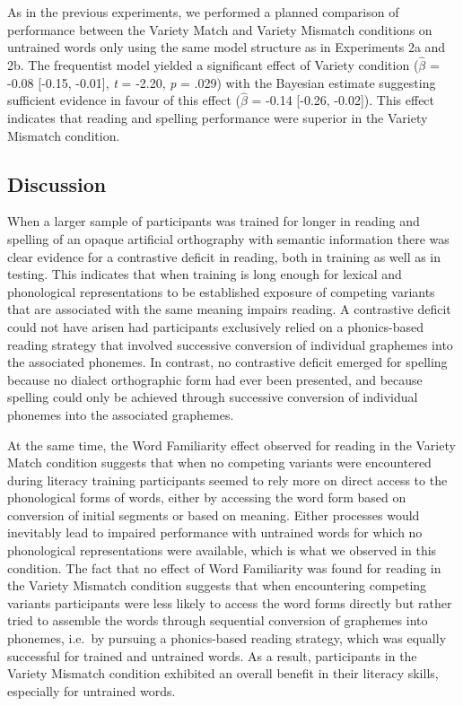 \documentclass[doc,floatsintext]{apa6}
\begin{document}
As in the previous experiments, we performed a planned comparison of
performance between the Variety Match and Variety Mismatch conditions on
untrained words only using the same model structure as in Experiments 2a
and 2b. The frequentist model yielded a significant effect of Variety
condition (\(\hat{\beta}\) = -0.08 {[}-0.15, -0.01{]}, \emph{t} = -2.20,
\emph{p} = .029) with the Bayesian estimate suggesting sufficient
evidence in favour of this effect (\(\hat{\beta}\) = -0.14 {[}-0.26,
-0.02{]}). This effect indicates that reading and spelling performance
were superior in the Variety Mismatch condition.

\subsection{Discussion}\label{discussion-3}

When a larger sample of participants was trained for longer in reading
and spelling of an opaque artificial orthography with semantic
information there was clear evidence for a contrastive deficit in
reading, both in training as well as in testing. This indicates that
when training is long enough for lexical and phonological
representations to be established exposure of competing variants that
are associated with the same meaning impairs reading. A contrastive
deficit could not have arisen had participants exclusively relied on a
phonics-based reading strategy that involved successive conversion of
individual graphemes into the associated phonemes. In contrast, no
contrastive deficit emerged for spelling because no dialect orthographic
form had ever been presented, and because spelling could only be
achieved through successive conversion of individual phonemes into the
associated graphemes.

At the same time, the Word Familiarity effect observed for reading in
the Variety Match condition suggests that when no competing variants
were encountered during literacy training participants seemed to rely
more on direct access to the phonological forms of words, either by
accessing the word form based on conversion of initial segments or based
on meaning. Either processes would inevitably lead to impaired
performance with untrained words for which no phonological
representations were available, which is what we observed in this
condition. The fact that no effect of Word Familiarity was found for
reading in the Variety Mismatch condition suggests that when
encountering competing variants participants were less likely to access
the word forms directly but rather tried to assemble the words through
sequential conversion of graphemes into phonemes, i.e.~by pursuing a
phonics-based reading strategy, which was equally successful for trained
and untrained words. As a result, participants in the Variety Mismatch
condition exhibited an overall benefit in their literacy skills,
especially for untrained words.
\end{document}
